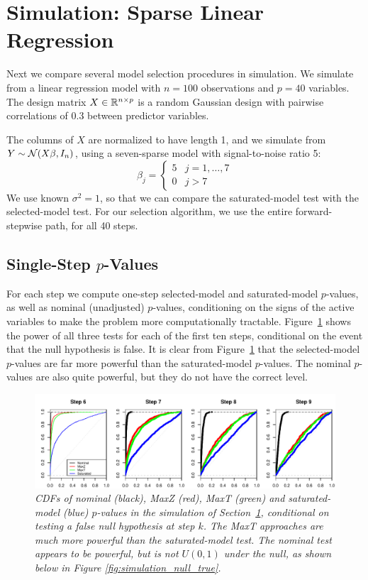 \documentclass{article}
\begin{document}
\section{Simulation: Sparse Linear Regression}
\label{sec:sparseReg}

Next we compare several model selection procedures in simulation. We simulate from a linear regression model with $n=100$ observations and $p=40$ variables. The design matrix $X\in\mathbb{R}^{n\times p}$ is a random Gaussian design with pairwise correlations of 0.3 between predictor variables.

The columns of $X$ are normalized to have length 1, and we simulate from $Y \sim \mathcal{N}(X\beta,I_n)$, using a seven-sparse model with signal-to-noise ratio 5:
\[
\beta_j = \left\{\begin{matrix}5 & j = 1,\ldots,7\\ 0 &
    j>7\end{matrix}\right.
\]
We use known $\sigma^2=1$, so that we can compare the saturated-model test with the selected-model test. For our selection algorithm, we use the entire forward-stepwise path, for all 40 steps. 

\subsection{Single-Step $p$-Values}

For each step we compute one-step selected-model and saturated-model $p$-values, as well as nominal (unadjusted) $p$-values, conditioning on the signs of the active variables to make the problem more computationally tractable. Figure~\ref{fig:simulation_null_false} shows the power of all three tests for each of the first ten steps, conditional on the event that the null hypothesis is false. It is clear from Figure~\ref{fig:simulation_null_false} that the selected-model $p$-values are far more powerful than the saturated-model $p$-values. The nominal $p$-values are also quite powerful, but they do not have the correct level.

\begin{figure}[h]
  \centering
  \includegraphics[width=1\textwidth]{figs/simulation_snr_5_alpha_05_null_false.pdf}
  \caption{\em  CDFs of nominal (black), MaxZ (red), MaxT (green) and  saturated-model (blue) $p$-values in the simulation of Section~\ref{sec:sparseReg}, conditional on testing a false null hypothesis at step $k$. The MaxT approaches are much more powerful than the saturated-model test. The nominal test appears to be powerful, 
  but is not $U(0,1)$ under the null, as shown below in Figure \ref{fig:simulation_null_true}.}
  \label{fig:simulation_null_false}
\end{figure}
\end{document}
